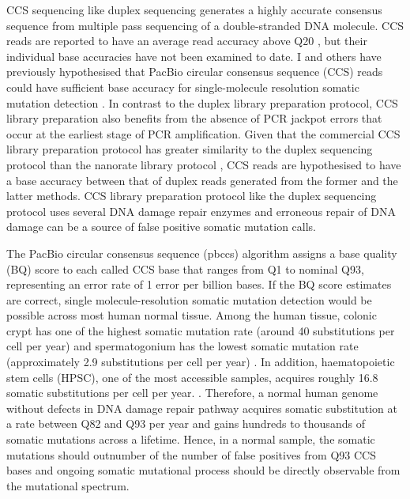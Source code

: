 CCS sequencing like duplex sequencing generates a highly accurate consensus sequence from multiple pass sequencing of a double-stranded DNA molecule. CCS reads are reported to have an average read accuracy above Q20 \cite{Wenger2019-pw}, but their individual base accuracies have not been examined to date. I and others have previously hypothesised that PacBio circular consensus sequence (CCS) reads could have sufficient base accuracy for single-molecule resolution somatic mutation detection \cite{Salk2018-cp}. In contrast to the duplex library preparation protocol, CCS library preparation also benefits from the absence of PCR jackpot errors that occur at the earliest stage of PCR amplification. Given that the commercial CCS library preparation protocol has greater similarity to the duplex sequencing protocol \cite{Schmitt2012-yr} than the nanorate library protocol \cite{Abascal2021-pk}, CCS reads are hypothesised to have a base accuracy between that of duplex reads generated from the former and the latter methods. CCS library preparation protocol like the duplex sequencing protocol uses several DNA damage repair enzymes and erroneous repair of DNA damage can be a source of false positive somatic mutation calls. 

The PacBio circular consensus sequence (pbccs) algorithm assigns a base quality (BQ) score to each called CCS base that ranges from Q1 to nominal Q93, representing an error rate of 1 error per billion bases. If the BQ score estimates are correct, single molecule-resolution somatic mutation detection would be possible across most human normal tissue. Among the human tissue, colonic crypt has one of the highest somatic mutation rate (around 40 substitutions per cell per year) \cite{Lee-Six2019-vt} and spermatogonium has the lowest somatic mutation rate (approximately 2.9 substitutions per cell per year) \cite{Rahbari2016-ot}. In addition, haematopoietic stem cells (HPSC), one of the most accessible samples, acquires roughly 16.8 somatic substitutions per cell per year. \cite{Mitchell2022-ry, Osorio2018-mh}. Therefore, a normal human genome without defects in DNA damage repair pathway acquires somatic substitution at a rate between Q82 and Q93 per year and gains hundreds to thousands of somatic mutations across a lifetime. Hence, in a normal sample, the somatic mutations should outnumber of the number of false positives from Q93 CCS bases and ongoing somatic mutational process should be directly observable from the mutational spectrum.  

